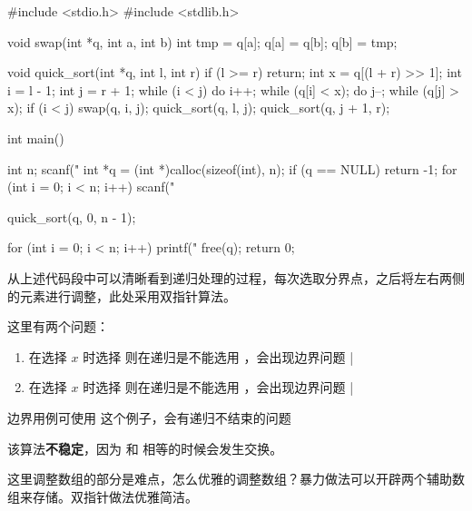 \begin{mycpptwocol}
    #include <stdio.h>
    #include <stdlib.h>

    void swap(int *q, int a, int b) {
        int tmp = q[a];
        q[a] = q[b];
        q[b] = tmp;
    }

    void quick_sort(int *q, int l, int r) {
        if (l >= r) {
            return;
        }
        int x = q[(l + r) >> 1];
        int i = l - 1;
        int j = r + 1;
        while (i < j) {
            do i++; while (q[i] < x);
            do j--; while (q[j] > x);
            if (i < j) {
                swap(q, i, j);
            }
        }
        quick_sort(q, l, j);
        quick_sort(q, j + 1, r);
    }

    int main() {
        int n;
        scanf("%
        int *q = (int *)calloc(sizeof(int), n);
        if (q == NULL) {
            return -1;
        }
        for (int i = 0; i < n; i++) {
            scanf("%
        }

        quick_sort(q, 0, n - 1);

        for (int i = 0; i < n; i++) {
            printf("%
        }
        free(q);
        return 0;
    }
\end{mycpptwocol}

从上述代码段中可以清晰看到递归处理的过程，每次选取分界点，之后将左右两侧的元素进行调整，此处采用双指针算法。

\begin{keypoint}
    这里有两个问题：
    \begin{enumerate}
        \item 在选择 $x$ 时选择  则在递归是不能选用 ，会出现边界问题 |  
        \item 在选择 $x$ 时选择  则在递归是不能选用 ，会出现边界问题 |  
    \end{enumerate}

    边界用例可使用  这个例子，会有递归不结束的问题
\end{keypoint}

\begin{information}
    该算法\textbf{不稳定}，因为  和  相等的时候会发生交换。

    这里调整数组的部分是难点，怎么优雅的调整数组？暴力做法可以开辟两个辅助数组来存储。双指针做法优雅简洁。
\end{information}

